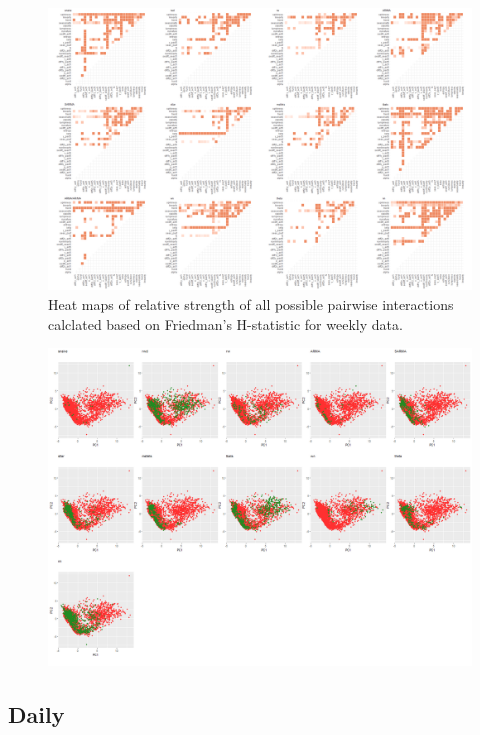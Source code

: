 \documentclass[11pt,a4paper,]{article}
\theoremstyle{definition}
\theoremstyle{definition}
\theoremstyle{definition}
\theoremstyle{remark}
\begin{document}
\begin{figure}
\centering
\includegraphics{figures/friedmanHW-1.png}
\caption{\label{fig:friedmanHW}Heat maps of relative strength of all
possible pairwise interactions calclated based on Friedman's H-statistic
for weekly data.}
\end{figure}

\newpage

\begin{figure}[h]

{\centering \includegraphics{figures/pca_weekly-1} 

}

\end{figure}

\newpage

\subsection{Daily}\label{daily}
\end{document}

